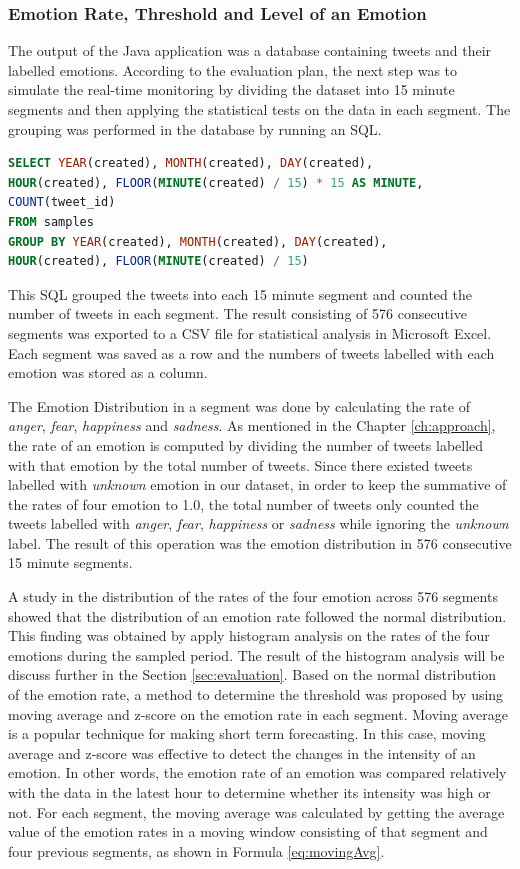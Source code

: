 \subsubsection{Emotion Rate, Threshold and Level of an Emotion}
The output of the Java application was a database containing tweets and their labelled emotions. According to the evaluation plan, the next step was to simulate the real-time monitoring by dividing the dataset into 15 minute segments and then applying the statistical tests on the data in each segment. The grouping was performed in the database by running an SQL.

\begin{lstlisting}[language=SQL]
SELECT YEAR(created), MONTH(created), DAY(created), 
HOUR(created), FLOOR(MINUTE(created) / 15) * 15 AS MINUTE, 
COUNT(tweet_id) 
FROM samples 
GROUP BY YEAR(created), MONTH(created), DAY(created), 
HOUR(created), FLOOR(MINUTE(created) / 15)
\end{lstlisting}

This SQL grouped the tweets into each 15 minute segment and counted the number of tweets in each segment. The result consisting of 576 consecutive segments was exported to a CSV file for statistical analysis in Microsoft Excel. Each segment was saved as a row and the numbers of tweets labelled with each emotion was stored as a column.

The Emotion Distribution in a segment was done by calculating the rate of \textit{anger}, \textit{fear}, \textit{happiness} and \textit{sadness}. As mentioned in the Chapter \ref{ch:approach}, the rate of an emotion is computed by dividing the number of tweets labelled with that emotion by the total number of tweets. Since there existed tweets labelled with \textit{unknown} emotion in our dataset, in order to keep the summative of the rates of four emotion to 1.0, the total number of tweets only counted the tweets labelled with \textit{anger}, \textit{fear}, \textit{happiness} or \textit{sadness} while ignoring the \textit{unknown} label. The result of this operation was the emotion distribution in 576 consecutive 15 minute segments. 

A study in the distribution of the rates of the four emotion across 576 segments showed that the distribution of an emotion rate followed the normal distribution. This finding was obtained by apply histogram analysis on the rates of the four emotions during the sampled period. The result of the histogram analysis will be discuss further in the Section \ref{sec:evaluation}. Based on the normal distribution of the emotion rate, a method to determine the threshold was proposed by using moving average and z-score on the emotion rate in each segment. Moving average is a popular technique for making short term forecasting. In this case, moving average and z-score was effective to detect the changes in the intensity of an emotion. In other words, the emotion rate of an emotion was compared relatively with the data in the latest hour to determine whether its intensity was high or not. For each segment, the moving average was calculated by getting the average value of the emotion rates in a moving window consisting of that segment and four previous segments, as shown in Formula \ref{eq:movingAvg}.

